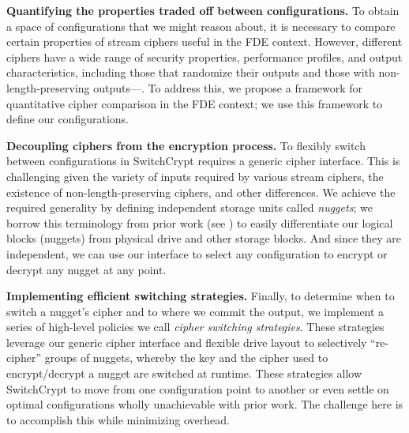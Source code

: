 \textbf{Quantifying the properties traded off between configurations.} To obtain
a space of configurations that we might reason about, it is necessary to compare
certain properties of stream ciphers useful in the FDE context. However,
different ciphers have a wide range of security properties, performance
profiles, and output characteristics, including those that randomize their
outputs and those with non-length-preserving outputs---. To address this, we propose a framework for
quantitative cipher comparison in the FDE context; we use this framework to
define our configurations.

\textbf{Decoupling ciphers from the encryption process.} To flexibly switch
between configurations in SwitchCrypt requires a generic cipher interface. This
is challenging given the variety of inputs required by various stream ciphers,
the existence of non-length-preserving ciphers, and other differences. We
achieve the required generality by defining independent storage units called
\emph{nuggets}; we borrow this terminology from prior work (see
\cite{StrongBox}) to easily differentiate our logical blocks (nuggets) from
physical drive and other storage blocks. And since they are independent, we can
use our interface to select any configuration to encrypt or decrypt any nugget
at any point.

\textbf{Implementing efficient switching strategies.} Finally, to determine when
to switch a nugget's cipher and to where we commit the output, we implement a
series of high-level policies we call \textit{cipher switching strategies}.
These strategies leverage our generic cipher interface and flexible drive layout
to selectively ``re-cipher'' groups of nuggets, whereby the key and the cipher
used to encrypt/decrypt a nugget are switched at runtime. These strategies allow
SwitchCrypt to move from one configuration point to another or even settle on
optimal configurations wholly unachievable with prior work. The challenge
here is to accomplish this while minimizing overhead.
